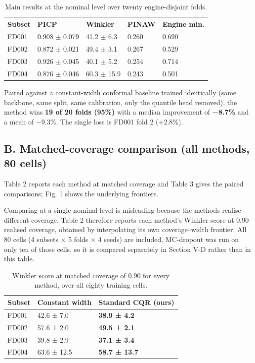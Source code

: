 ﻿\documentclass[journal]{IEEEtran}
\begin{document}
\begin{table}[!t]
\centering\scriptsize
\caption{Main results at the nominal level over twenty engine-disjoint folds.}
\begin{tabular}{@{}lllll@{}}
\toprule\noalign{}
Subset & PICP & Winkler & PINAW & Engine min. \\
\midrule\noalign{}
FD001 & 0.908 \(\pm\) 0.079 & 41.2 \(\pm\) 6.3 & 0.260 & 0.690 \\
FD002 & 0.872 \(\pm\) 0.021 & 49.4 \(\pm\) 3.1 & 0.267 & 0.529 \\
FD003 & 0.926 \(\pm\) 0.045 & 40.1 \(\pm\) 5.2 & 0.254 & 0.714 \\
FD004 & 0.876 \(\pm\) 0.046 & 60.3 \(\pm\) 15.9 & 0.243 & 0.501 \\
\bottomrule
\end{tabular}
\end{table}

Paired against a constant-width conformal baseline trained identically (same backbone, same split, same calibration, only the quantile head removed), the method wins \textbf{19 of 20 folds (95\%)} with a median improvement of \textbf{−8.7\%} and a mean of −9.3\%. The single loss is FD001 fold 2 (+2.8\%).

\subsection{B. Matched-coverage comparison (all methods, 80 cells)}\label{b.-matched-coverage-comparison-all-methods-80-cells}

Table 2 reports each method at matched coverage and Table 3 gives the paired comparisons; Fig. 1 shows the underlying frontiers.

Comparing at a single nominal level is misleading because the methods realise different coverage. Table 2 therefore reports each method's Winkler score at 0.90 realised coverage, obtained by interpolating its own coverage--width frontier. All 80 cells (4 subsets × 5 folds × 4 seeds) are included. MC-dropout was run on only ten of those cells, so it is compared separately in Section V-D rather than in this table.

\begin{table}[!t]
\centering\scriptsize
\caption{Winkler score at matched coverage of 0.90 for every method, over all eighty training cells.}
\begin{tabular}{@{}lll@{}}
\toprule\noalign{}
Subset & Constant width & \textbf{Standard CQR (ours)} \\
\midrule\noalign{}
FD001 & 42.6 ± 7.0 & \textbf{38.9 ± 4.2} \\
FD002 & 57.6 ± 2.0 & \textbf{49.5 ± 2.1} \\
FD003 & 39.8 ± 2.9 & \textbf{37.1 ± 3.4} \\
FD004 & 63.6 ± 12.5 & \textbf{58.7 ± 13.7} \\
\bottomrule
\end{tabular}
\end{table}
\end{document}
